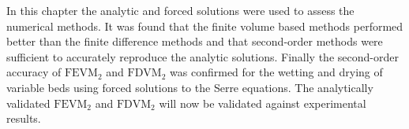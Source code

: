 \medskip
In this chapter the analytic and forced solutions were used to assess the numerical methods. It was found that the finite volume based methods performed better than the finite difference methods and that second-order methods were sufficient to accurately reproduce the analytic solutions. Finally the second-order accuracy of $\text{FEVM}_2$ and $\text{FDVM}_2$ was confirmed for the wetting and drying of variable beds using forced solutions to the Serre equations. The analytically validated $\text{FEVM}_2$ and $\text{FDVM}_2$ will now be validated against experimental results.
